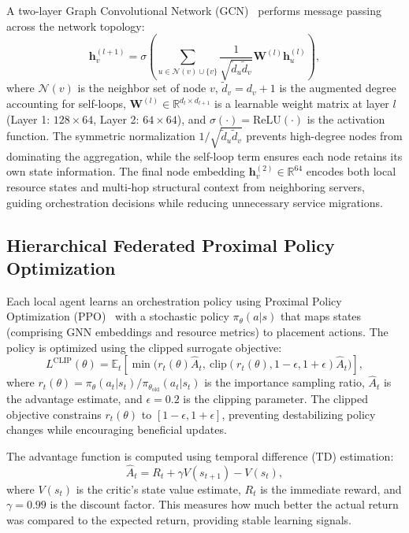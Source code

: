 \documentclass[conference]{IEEEtran}
\begin{document}
	A two-layer Graph Convolutional Network (GCN)~\cite{Kipf2017_GCN} performs message passing across the network topology:
	\begin{equation}
		\mathbf{h}_v^{(l+1)} = \sigma\!\left(\sum_{u \in \mathcal{N}(v) \cup \{v\}} \frac{1}{\sqrt{\tilde{d}_u \tilde{d}_v}} \mathbf{W}^{(l)} \mathbf{h}_u^{(l)}\right),
	\end{equation}
	where $\mathcal{N}(v)$ is the neighbor set of node $v$, $\tilde{d}_v = d_v + 1$ is the augmented degree accounting for self-loops, $\mathbf{W}^{(l)} \in \mathbb{R}^{d_l \times d_{l+1}}$ is a learnable weight matrix at layer $l$ (Layer 1: $128 \times 64$, Layer 2: $64 \times 64$), and $\sigma(\cdot) = \text{ReLU}(\cdot)$ is the activation function. The symmetric normalization $1/\sqrt{\tilde{d}_u \tilde{d}_v}$ prevents high-degree nodes from dominating the aggregation, while the self-loop term ensures each node retains its own state information. The final node embedding $\mathbf{h}_v^{(2)} \in \mathbb{R}^{64}$ encodes both local resource states and multi-hop structural context from neighboring servers, guiding orchestration decisions while reducing unnecessary service migrations.
	
	\subsection{Hierarchical Federated Proximal Policy Optimization}
	Each local agent learns an orchestration policy using Proximal Policy Optimization (PPO)~\cite{Schulman2017_PPO} with a stochastic policy $\pi_{\theta}(a|s)$ that maps states (comprising GNN embeddings and resource metrics) to placement actions. The policy is optimized using the clipped surrogate objective:
	\begin{equation}
		L^{\text{CLIP}}(\theta) = \mathbb{E}_t\!\left[\min\!\big(r_t(\theta)\hat{A}_t, \ \text{clip}(r_t(\theta), 1-\epsilon, 1+\epsilon)\hat{A}_t\big)\right],
	\end{equation}
	where $r_t(\theta) = \pi_\theta(a_t|s_t)/\pi_{\theta_{\text{old}}}(a_t|s_t)$ is the importance sampling ratio, $\hat{A}_t$ is the advantage estimate, and $\epsilon = 0.2$ is the clipping parameter. The clipped objective constrains $r_t(\theta)$ to $[1-\epsilon, 1+\epsilon]$, preventing destabilizing policy changes while encouraging beneficial updates.
	
	The advantage function is computed using temporal difference (TD) estimation:
	\begin{equation}
		\hat{A}_t = R_t + \gamma V(s_{t+1}) - V(s_t),
	\end{equation}
	where $V(s_t)$ is the critic's state value estimate, $R_t$ is the immediate reward, and $\gamma = 0.99$ is the discount factor. This measures how much better the actual return was compared to the expected return, providing stable learning signals.
	
\end{document}
